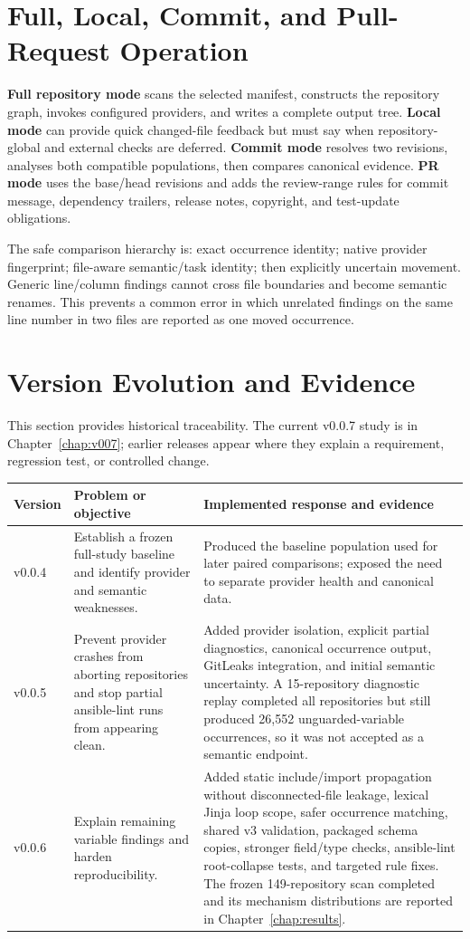 \section{Full, Local, Commit, and Pull-Request Operation}
\textbf{Full repository mode} scans the selected manifest, constructs the
repository graph, invokes configured providers, and writes a complete output
tree. \textbf{Local mode} can provide quick changed-file feedback but must say
when repository-global and external checks are deferred. \textbf{Commit mode}
resolves two revisions, analyses both compatible populations, then compares
canonical evidence. \textbf{PR mode} uses the base/head revisions and adds the
review-range rules for commit message, dependency trailers, release notes,
copyright, and test-update obligations.

The safe comparison hierarchy is: exact occurrence identity; native provider
fingerprint; file-aware semantic/task identity; then explicitly uncertain
movement. Generic line/column findings cannot cross file boundaries and become
semantic renames. This prevents a common error in which unrelated findings on
the same line number in two files are reported as one moved occurrence.

\section{Version Evolution and Evidence}
This section provides historical traceability. The current v0.0.7 study is in
Chapter~\ref{chap:v007}; earlier releases appear where they explain a
requirement, regression test, or controlled change.
\begin{longtable}{p{2.2cm}p{5.5cm}p{6.6cm}}
\toprule Version & Problem or objective & Implemented response and evidence \\
\midrule\endhead
v0.0.4 & Establish a frozen full-study baseline and identify provider and
semantic weaknesses. & Produced the baseline population used for later paired
comparisons; exposed the need to separate provider health and canonical data. \\
v0.0.5 & Prevent provider crashes from aborting repositories and stop partial
ansible-lint runs from appearing clean. & Added provider isolation, explicit
partial diagnostics, canonical occurrence output, GitLeaks integration, and
initial semantic uncertainty. A 15-repository diagnostic replay completed all
repositories but still produced 26,552 unguarded-variable occurrences, so it
was not accepted as a semantic endpoint. \\
v0.0.6 & Explain remaining variable findings and harden reproducibility. & Added
static include/import propagation without disconnected-file leakage, lexical
Jinja loop scope, safer occurrence matching, shared v3 validation, packaged
schema copies, stronger field/type checks, ansible-lint root-collapse tests,
and targeted rule fixes. The frozen 149-repository scan completed and its
mechanism distributions are reported in Chapter~\ref{chap:results}. \\
\bottomrule
\end{longtable}

